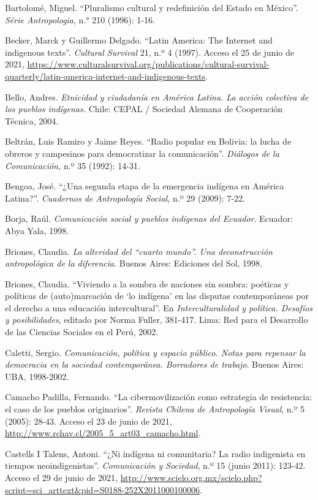 \documentclass{tufte-handout}
\begin{document}
\begin{hangparas}{.25in}{1}
Bartolomé, Miguel. ``Pluralismo cultural y redefinición del Estado en
México''. \emph{Série Antropologia}, n.° 210 (1996): 1-16.

Becker, Marck y Guillermo Delgado. ``Latin America: The Internet and
indigenous texts''. \emph{Cultural Survival} 21, n.º 4 (1997). Acceso el
25 de junio de 2021, \href{https://www.culturalsurvival.org/publications/cultural-survival-quarterly/latin-america-internet-and-indigenous-texts}{https://www.culturalsurvival.org/publications/cultural-survival-quarterly/latin-america-internet-and-indigenous-texts}.

Bello, Andres. \emph{Etnicidad y ciudadanía en América Latina. La acción
colectiva de los pueblos indígenas.} Chile: CEPAL / Sociedad Alemana de
Cooperación Técnica, 2004.

Beltrán, Luis Ramiro y Jaime Reyes. ``Radio popular en Bolivia: la lucha
de obreros y campesinos para democratizar la comunicación''.
\emph{Diálogos de la Comunicación,} n.º 35 (1992): 14-31.

Bengoa, José. ``¿Una segunda etapa de la emergencia indígena en América
Latina?''. \emph{Cuadernos de Antropología Social,} n.º 29 (2009): 7-22.

Borja, Raúl. \emph{Comunicación social y pueblos indígenas del Ecuador}.
Ecuador: Abya Yala, 1998.

Briones, Claudia. \emph{La alteridad del ``cuarto mundo''. Una
deconstrucción antropológica de la diferencia}. Buenos Aires: Ediciones
del Sol, 1998.

Briones, Claudia. ``Viviendo a la sombra de naciones sin sombra:
poéticas y políticas de (auto)marcación de `lo indígena' en las disputas
contemporáneas por el derecho a una educación intercultural''. En
\emph{Interculturalidad y política. Desafíos y posibilidades}, editado
por Norma Fuller, 381-417. Lima: Red para el Desarrollo de las Ciencias
Sociales en el Perú, 2002.

Caletti, Sergio. \emph{Comunicación, política y espacio público. Notas
para repensar la democracia en la sociedad contemporánea. Borradores de
trabajo}. Buenos Aires: UBA, 1998-2002.

Camacho Padilla, Fernando. ``La cibermovilización como estrategia de
resistencia: el caso de los pueblos originarios''. \emph{Revista Chilena
de Antropología Visual}, n.º 5 (2005): 28-43. Acceso el 23 de junio de
2021, \url{http://www.rchav.cl/2005_5_art03_camacho.html}.

Castells I Talens, Antoni. ``¿Ni indígena ni comunitaria? La radio
indigenista en tiempos neoindigenistas''. \emph{Comunicación y
Sociedad}, n.º 15 (junio 2011): 123-42. Acceso el 29 de junio de 2021,
\url{http://www.scielo.org.mx/scielo.php?script=sci_arttext\&pid=S0188-252X2011000100006}.


\end{hangparas}
\end{document}
